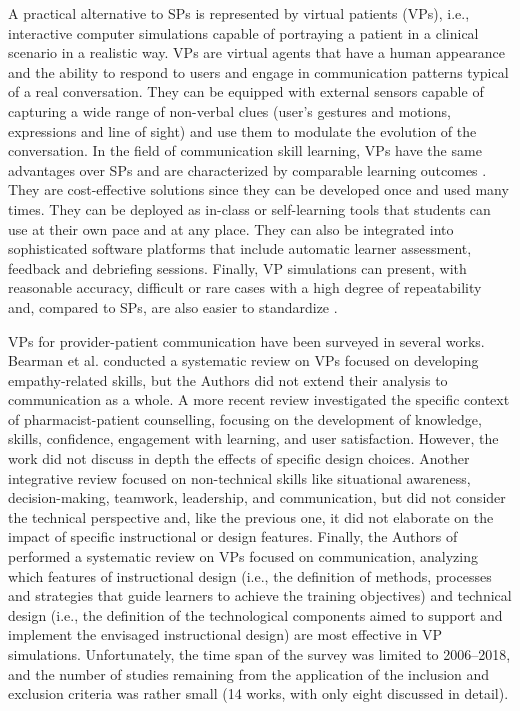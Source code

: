 A practical alternative to SPs is represented by virtual patients (VPs), i.e., interactive computer simulations capable of portraying a patient in a clinical scenario in a realistic way. VPs are virtual agents that have a human appearance and the ability to respond to users and engage in communication patterns typical of a real conversation. They can be equipped with external sensors capable of capturing a wide range of non-verbal clues (user's gestures and motions, expressions and line of sight) and use them to modulate the evolution of the conversation. In the field of communication skill learning, VPs have the same advantages over SPs and are characterized by comparable learning outcomes \cite{quail2016student}. They are cost-effective solutions since they can be developed once and used many times. They can be deployed as in-class or self-learning tools that students can use at their own pace and at any place. They can also be integrated into sophisticated software platforms that include automatic learner assessment, feedback and debriefing sessions. Finally, VP simulations can present, with reasonable accuracy, difficult or rare cases with a high degree of repeatability \cite{urresti2017virtual} and, compared to SPs, are also easier to standardize \cite{rogers2011developing}. 

VPs for provider-patient communication have been surveyed in several works. Bearman et al. \cite{bearman2015learning} conducted a systematic review on VPs focused on developing empathy-related skills, but the Authors did not extend their analysis to communication as a whole. A more recent review \cite{richardson2019virtualreview} investigated the specific context of pharmacist-patient counselling, focusing on the development of knowledge, skills, confidence, engagement with learning, and user satisfaction. However, the work did not discuss in depth the effects of specific design choices. Another integrative review \cite{peddle2016virtual} focused on non-technical skills like situational awareness, decision-making, teamwork, leadership, and communication, but did not consider the technical perspective and, like the previous one, it did not elaborate on the impact of specific instructional or design features.
Finally, the Authors of \cite{lee2020effective} performed a systematic review on VPs focused on communication, analyzing which features of instructional design (i.e., the definition of methods, processes and strategies that guide learners to achieve the training objectives) and technical design (i.e., the definition of the technological components aimed to support and implement the envisaged instructional design) are most effective in VP simulations. Unfortunately, the time span of the survey was limited to 2006--2018, and the number of studies remaining from the application of the inclusion and exclusion criteria was rather small (14 works, with only eight discussed in detail). 

